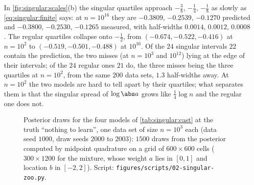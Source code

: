 \begin{refsection}
In \cref{fig:singular:scales}(b) the singular quartiles approach $-\frac38$, $-\frac14$, $-\frac18$ as slowly as \eqref{eq:singular:finite} says: at $n=10^{16}$ they are $-0.3809$, $-0.2539$, $-0.1270$ predicted and $-0.3800$, $-0.2530$, $-0.1265$ measured, with half-widths $0.0014$, $0.0012$, $0.0008$. The regular quartiles collapse onto $-\frac12$, from $(-0.674,-0.522,-0.416)$ at $n=10^2$ to $(-0.519,-0.501,-0.488)$ at $10^{16}$. Of the $24$ singular intervals $22$ contain the prediction, the two misses (at $n=10^3$ and $10^{12}$) lying at the edge of their intervals; of the $24$ regular ones $21$ do, the three misses being the three quartiles at $n=10^2$, from the same $200$ data sets, $1.3$ half-widths away. At $n=10^2$ the two models are hard to tell apart by their quartiles; what separates them is that the singular spread of $\log\abs a$ grows like $\frac14\log n$ and the regular one does not.

\begin{figure}[t]
\begin{fullwidth}
\centering
{}
\end{fullwidth}
\caption{Posterior draws for the four models of \cref{tab:singular:cast} at the truth ``nothing to learn'', one data set of size $n=10^3$ each (data seed $1000$, draw seeds $2000$ to $2003$): $1500$ draws from the posterior computed by midpoint quadrature on a grid of $600\times600$ cells ($300\times1200$ for the mixture, whose weight $a$ lies in $[0,1]$ and location $b$ in $[-2,2]$). Script: \texttt{figures/scripts/02-singular-zoo.py}.}\label{fig:singular:zoo}
\end{figure}


\end{refsection}
